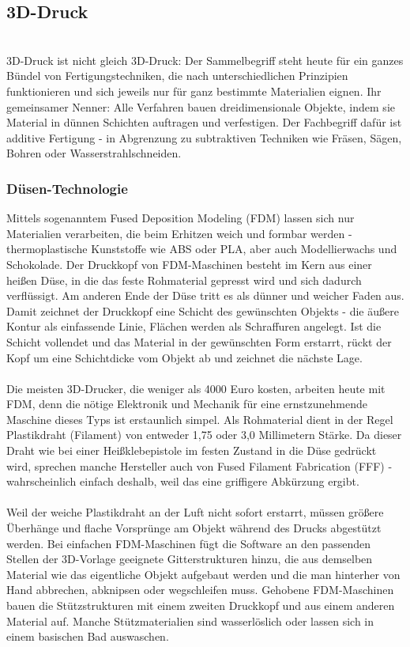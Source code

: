 \subsection{3D-Druck}\ \\
3D-Druck ist nicht gleich 3D-Druck: Der Sammelbegriff steht heute für ein ganzes Bündel von Fertigungstechniken, die nach unterschiedlichen Prinzipien funktionieren und sich jeweils nur für ganz bestimmte Materialien eignen. Ihr gemeinsamer Nenner: Alle Verfahren bauen dreidimensionale Objekte, indem sie Material in dünnen Schichten auftragen und verfestigen. Der Fachbegriff dafür ist additive Fertigung - in Abgrenzung zu subtraktiven Techniken wie Fräsen, Sägen, Bohren oder Wasserstrahlschneiden.

\subsubsection{Düsen-Technologie}
Mittels sogenanntem Fused Deposition Modeling (FDM) lassen sich nur Materialien verarbeiten, die beim Erhitzen weich und formbar werden - thermoplastische Kunststoffe wie ABS oder PLA, aber auch Modellierwachs und Schokolade. Der Druckkopf von FDM-Maschinen besteht im Kern aus einer heißen Düse, in die das feste Rohmaterial gepresst wird und sich dadurch verflüssigt. Am anderen Ende der Düse tritt es als dünner und weicher Faden aus. Damit zeichnet der Druckkopf eine Schicht des gewünschten Objekts - die äußere Kontur als einfassende Linie, Flächen werden als Schraffuren angelegt. Ist die Schicht vollendet und das Material in der gewünschten Form erstarrt, rückt der Kopf um eine Schichtdicke vom Objekt ab und zeichnet die nächste Lage.\\
\\
Die meisten 3D-Drucker, die weniger als 4000 Euro kosten, arbeiten heute mit FDM, denn die nötige Elektronik und Mechanik für eine ernstzunehmende Maschine dieses Typs ist erstaunlich simpel. Als Rohmaterial dient in der Regel Plastikdraht (Filament) von entweder 1,75 oder 3,0 Millimetern Stärke. Da dieser Draht wie bei einer Heißklebepistole im festen Zustand in die Düse gedrückt wird, sprechen manche Hersteller auch von Fused Filament Fabrication (FFF) - wahrscheinlich einfach deshalb, weil das eine griffigere Abkürzung ergibt.\\
\\
Weil der weiche Plastikdraht an der Luft nicht sofort erstarrt, müssen größere Überhänge und flache Vorsprünge am Objekt während des Drucks abgestützt werden. Bei einfachen FDM-Maschinen fügt die Software an den passenden Stellen der 3D-Vorlage geeignete Gitterstrukturen hinzu, die aus demselben Material wie das eigentliche Objekt aufgebaut werden und die man hinterher von Hand abbrechen, abknipsen oder wegschleifen muss. Gehobene FDM-Maschinen bauen die Stützstrukturen mit einem zweiten Druckkopf und aus einem anderen Material auf. Manche Stützmaterialien sind wasserlöslich oder lassen sich in einem basischen Bad auswaschen.\\
